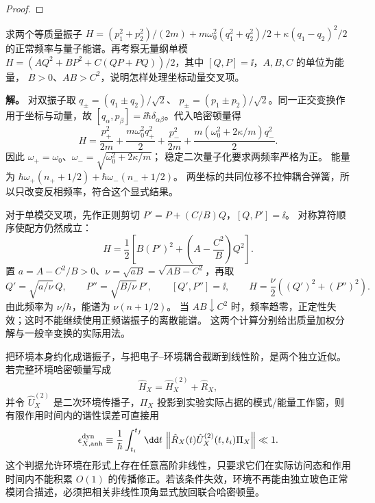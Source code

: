 \begin{proof}
\end{proof}

\begin{exbox}[耦合振子的正常模与坐标动量交叉项]
求两个等质量振子
$H=(p_1^2+p_2^2)/(2m)+m\omega_0^2(q_1^2+q_2^2)/2+\kappa(q_1-q_2)^2/2$
的正常频率与量子能谱。再考察无量纲单模
$H=(A Q^2+B P^2+C(QP+PQ))/2$，其中 $[Q,P]=\ii$，$A,B,C$ 的单位为能量，
$B>0$、$AB>C^2$，说明怎样处理坐标动量交叉项。

\textbf{解。} 对双振子取 $q_\pm=(q_1\pm q_2)/\sqrt2$、
$p_\pm=(p_1\pm p_2)/\sqrt2$。同一正交变换作用于坐标与动量，故
$[q_\alpha,p_\beta]=\ii\hbar\delta_{\alpha\beta}$。代入哈密顿量得
\[
H=\frac{p_+^2}{2m}+\frac{m\omega_0^2q_+^2}{2}
+\frac{p_-^2}{2m}+\frac{m(\omega_0^2+2\kappa/m)q_-^2}{2}.
\]
因此 $\omega_+=\omega_0$、$\omega_-=\sqrt{\omega_0^2+2\kappa/m}$；
稳定二次量子化要求两频率严格为正。
能量为 $\hbar\omega_+(n_++1/2)+\hbar\omega_-(n_-+1/2)$。
两坐标的共同位移不拉伸耦合弹簧，所以只改变反相频率，符合这个显式结果。

对于单模交叉项，先作正则剪切 $P'=P+(C/B)Q$，$[Q,P']=\ii$。
对称算符顺序使配方仍然成立：
\[
H=\frac12\left[B(P')^2+\left(A-\frac{C^2}{B}\right)Q^2\right].
\]
置 $a=A-C^2/B>0$、$\nu=\sqrt{aB}=\sqrt{AB-C^2}$，再取
\[
Q'=\sqrt{a/\nu}\,Q,\qquad P''=\sqrt{B/\nu}\,P',\qquad
[Q',P'']=\ii,\qquad H=\frac\nu2((Q')^2+(P'')^2).
\]
由此频率为 $\nu/\hbar$，能谱为 $\nu(n+1/2)$。
当 $AB\downarrow C^2$ 时，频率趋零，正定性失效；这时不能继续使用正频谐振子的离散能谱。
这两个计算分别给出质量加权分解与一般辛变换的实际用法。
\end{exbox}



把环境本身约化成谐振子，与把电子--环境耦合截断到线性阶，是两个独立近似。若完整环境哈密顿量写成
\[
\hat H_X
=
\hat H_X^{(2)}+\hat R_X,
\]
并令 $\hat U_X^{(2)}$ 是二次环境传播子，$\Pi_X$ 投影到实验实际占据的模式/能量工作窗，则有限作用时间内的谐性误差可直接用
\begin{equation}
{
\epsilon_{X,\rm anh}^{\rm dyn}
\equiv
\frac1\hbar
\int_{t_i}^{t_f}\dd t\,
\left\|
\hat R_X(t)
\hat U_X^{(2)}(t,t_i)\Pi_X
\right\|
\ll1 .}
\label{eq:environment_anharmonic_duhamel_control}
\end{equation}
这个判据允许环境在形式上存在任意高阶非线性，只要求它们在实际访问态和作用时间内不能积累 $O(1)$ 的传播修正。若该条件失效，环境不再能由独立玻色正常模闭合描述，必须把相关非线性顶角显式放回联合哈密顿量。

